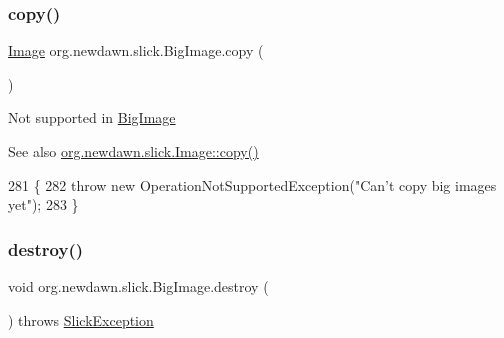 \mbox{\label{classorg_1_1newdawn_1_1slick_1_1_big_image_aac83f6ad3f920d86ae7497aa9c417e59}} 
\subsubsection{\texorpdfstring{copy()}{copy()}}
{\footnotesize\ttfamily \mbox{\hyperlink{classorg_1_1newdawn_1_1slick_1_1_image}{Image}} org.\+newdawn.\+slick.\+Big\+Image.\+copy (\begin{DoxyParamCaption}{ }\end{DoxyParamCaption})\hspace{0.3cm}{\ttfamily [inline]}}

Not supported in \mbox{\hyperlink{classorg_1_1newdawn_1_1slick_1_1_big_image}{Big\+Image}}

\begin{DoxySeeAlso}{See also}
\mbox{\hyperlink{classorg_1_1newdawn_1_1slick_1_1_image_a1a60f42d060227bc270a1a254eb36639}{org.\+newdawn.\+slick.\+Image\+::copy()}} 
\end{DoxySeeAlso}

\begin{DoxyCode}
281                         \{
282         \textcolor{keywordflow}{throw} \textcolor{keyword}{new} OperationNotSupportedException(\textcolor{stringliteral}{"Can't copy big images yet"});
283     \}
\end{DoxyCode}
\mbox{\label{classorg_1_1newdawn_1_1slick_1_1_big_image_a0d3d5a2b6bde50b98a7eb04bf4e1bbc2}} 
\subsubsection{\texorpdfstring{destroy()}{destroy()}}
{\footnotesize\ttfamily void org.\+newdawn.\+slick.\+Big\+Image.\+destroy (\begin{DoxyParamCaption}{ }\end{DoxyParamCaption}) throws \mbox{\hyperlink{classorg_1_1newdawn_1_1slick_1_1_slick_exception}{Slick\+Exception}}\hspace{0.3cm}{\ttfamily [inline]}}

